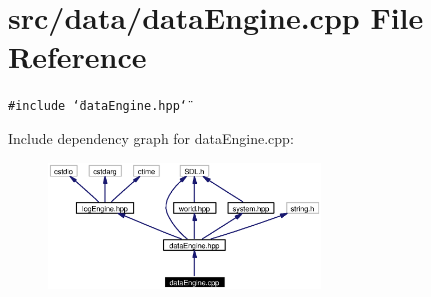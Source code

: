 \section{src/data/data\-Engine.cpp File Reference}
\label{dataEngine_8cpp}
{\tt \#include \char`\"{}data\-Engine.hpp\char`\"{}}\par


Include dependency graph for data\-Engine.cpp:\begin{figure}[H]
\begin{center}
\leavevmode
\includegraphics[width=205pt]{dataEngine_8cpp__incl}
\end{center}
\end{figure}
